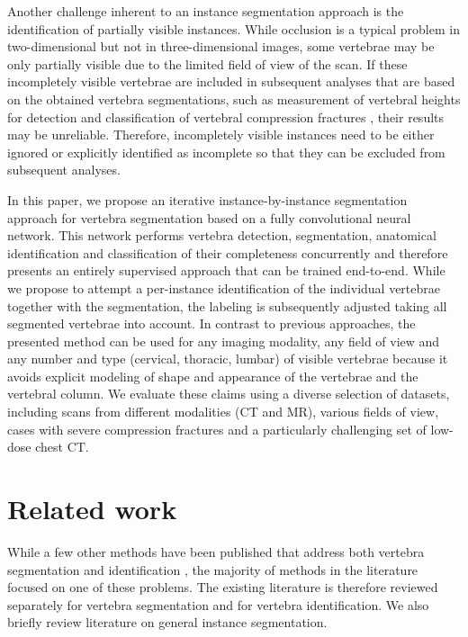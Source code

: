 \documentclass[authoryear,5p,final,times]{elsarticle}
\begin{document}
    Another challenge inherent to an instance segmentation approach is the identification of partially visible instances. While occlusion is a typical problem in two-dimensional but not in three-dimensional images, some vertebrae may be only partially visible due to the limited field of view of the scan. If these incompletely visible vertebrae are included in subsequent analyses that are based on the obtained vertebra segmentations, such as measurement of vertebral heights for detection and classification of vertebral compression fractures \citep{Grigoryan2003}, their results may be unreliable. Therefore, incompletely visible instances need to be either ignored or explicitly identified as incomplete so that they can be excluded from subsequent analyses.

    In this paper, we propose an iterative instance-by-instance segmentation approach for vertebra segmentation based on a fully convolutional neural network. This network performs vertebra detection, segmentation, anatomical identification and classification of their completeness concurrently and therefore presents an entirely supervised approach that can be trained end-to-end. While we propose to attempt a per-instance identification of the individual vertebrae together with the segmentation, the labeling is subsequently adjusted taking all segmented vertebrae into account. In contrast to previous approaches, the presented method can be used for any imaging modality, any field of view and any number and type (cervical, thoracic, lumbar) of visible vertebrae because it avoids explicit modeling of shape and appearance of the vertebrae and the vertebral column. We evaluate these claims using a diverse selection of datasets, including scans from different modalities (CT and MR), various fields of view, cases with severe compression fractures and a particularly challenging set of low-dose chest CT.

    \section{Related work}

    While a few other methods have been published that address both vertebra segmentation and identification \citep{Klinder2009,Kelm2013,Chu2015,Suzani2015,Sekuboyina2017}, the majority of methods in the literature focused on one of these problems. The existing literature is therefore reviewed separately for vertebra segmentation and for vertebra identification. We also briefly review literature on general instance segmentation.
\end{document}
